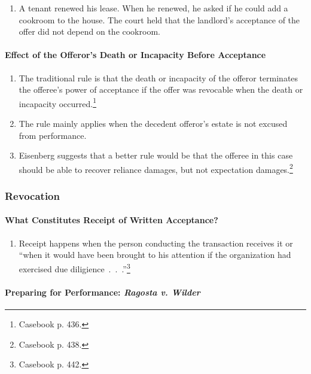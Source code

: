 \begin{enumerate}
    \item A tenant renewed his lease. When he renewed, he asked if he could 
    add a cookroom to the house. The court held that the landlord's acceptance 
    of the offer did not depend on the cookroom.
\end{enumerate}

\paragraph{Effect of the Offeror's Death or Incapacity Before Acceptance}

\begin{enumerate}
    \item The traditional rule is that the death or incapacity of the offeror 
    terminates the offeree's power of acceptance if the offer was revocable 
    when the death or incapacity occurred.\footnote{Casebook p. 436.}
    \item The rule mainly applies when the decedent offeror's estate is not 
    excused from performance.
    \item Eisenberg suggests that a better rule would be that the offeree in 
    this case should be able to recover reliance damages, but not expectation 
    damages.\footnote{Casebook p. 438.}
\end{enumerate}

\subsubsection{Revocation}

\paragraph{What Constitutes Receipt of Written Acceptance?}

\begin{enumerate}
    \item Receipt happens when the person conducting the transaction receives 
    it or ``when it would have been brought to his attention if the 
    organization had exercised due diligience~.~.~.''\footnote{Casebook p. 
    442.}
\end{enumerate}

\paragraph{Preparing for Performance: \emph{Ragosta v. Wilder}}

